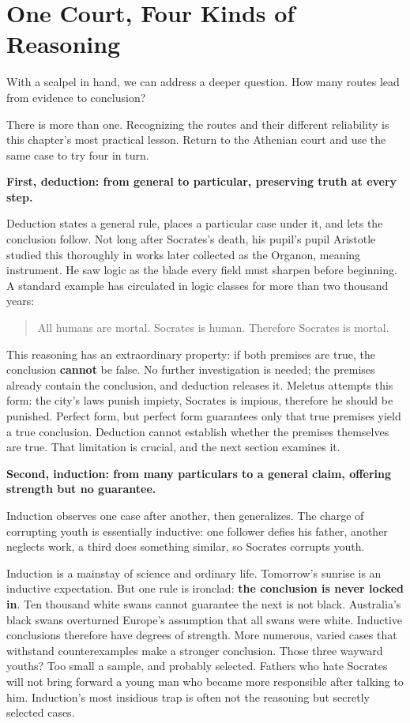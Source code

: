 \section{One Court, Four Kinds of Reasoning}
With a scalpel in hand, we can address a deeper question. How many routes lead from evidence to conclusion?

There is more than one. Recognizing the routes and their different reliability is this chapter's most practical lesson. Return to the Athenian court and use the same case to try four in turn.

\textbf{First, deduction: from general to particular, preserving truth at every step.}

Deduction states a general rule, places a particular case under it, and lets the conclusion follow. Not long after Socrates's death, his pupil's pupil Aristotle studied this thoroughly in works later collected as the Organon, meaning instrument. He saw logic as the blade every field must sharpen before beginning. A standard example has circulated in logic classes for more than two thousand years:

\begin{quote}
All humans are mortal. Socrates is human. Therefore Socrates is mortal.
\end{quote}
This reasoning has an extraordinary property: if both premises are true, the conclusion \textbf{cannot} be false. No further investigation is needed; the premises already contain the conclusion, and deduction releases it. Meletus attempts this form: the city's laws punish impiety, Socrates is impious, therefore he should be punished. Perfect form, but perfect form guarantees only that true premises yield a true conclusion. Deduction cannot establish whether the premises themselves are true. That limitation is crucial, and the next section examines it.

\textbf{Second, induction: from many particulars to a general claim, offering strength but no guarantee.}

Induction observes one case after another, then generalizes. The charge of corrupting youth is essentially inductive: one follower defies his father, another neglects work, a third does something similar, so Socrates corrupts youth.

Induction is a mainstay of science and ordinary life. Tomorrow's sunrise is an inductive expectation. But one rule is ironclad: \textbf{the conclusion is never locked in}. Ten thousand white swans cannot guarantee the next is not black. Australia's black swans overturned Europe's assumption that all swans were white. Inductive conclusions therefore have degrees of strength. More numerous, varied cases that withstand counterexamples make a stronger conclusion. Those three wayward youths? Too small a sample, and probably selected. Fathers who hate Socrates will not bring forward a young man who became more responsible after talking to him. Induction's most insidious trap is often not the reasoning but secretly selected cases.

